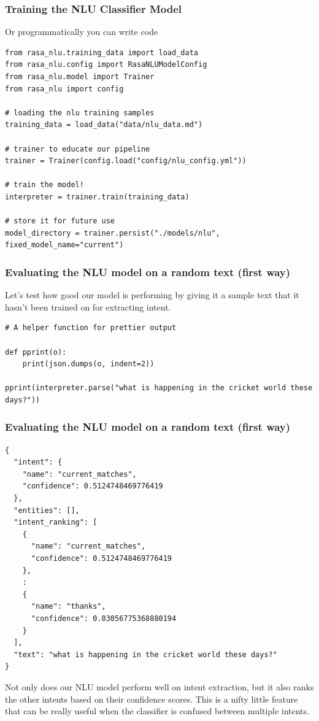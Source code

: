  \begin{frame}[fragile]\frametitle{Training the NLU Classifier Model}
 Or programmatically you can write code
 
\begin{lstlisting}
from rasa_nlu.training_data import load_data
from rasa_nlu.config import RasaNLUModelConfig
from rasa_nlu.model import Trainer
from rasa_nlu import config

# loading the nlu training samples
training_data = load_data("data/nlu_data.md")

# trainer to educate our pipeline
trainer = Trainer(config.load("config/nlu_config.yml"))

# train the model!
interpreter = trainer.train(training_data)

# store it for future use
model_directory = trainer.persist("./models/nlu", fixed_model_name="current")
\end{lstlisting}

\end{frame}

 \begin{frame}[fragile]\frametitle{Evaluating the NLU model on a random text (first way)}
 

Let’s test how good our model is performing by giving it a sample text that it hasn’t been trained on for extracting intent. 
\begin{lstlisting}
# A helper function for prettier output

def pprint(o):   
    print(json.dumps(o, indent=2))
    
pprint(interpreter.parse("what is happening in the cricket world these days?"))
\end{lstlisting}
 
\end{frame}

 \begin{frame}[fragile]\frametitle{Evaluating the NLU model on a random text (first way)}

\begin{lstlisting}
{
  "intent": {
    "name": "current_matches",
    "confidence": 0.5124748469776419
  },
  "entities": [],
  "intent_ranking": [
    {
      "name": "current_matches",
      "confidence": 0.5124748469776419
    },
	:
    {
      "name": "thanks",
      "confidence": 0.03056775368880194
    }
  ],
  "text": "what is happening in the cricket world these days?"
}
\end{lstlisting}
Not only does our NLU model perform well on intent extraction, but it also ranks the other intents based on their confidence scores. This is a nifty little feature that can be really useful when the classifier is confused between multiple intents.
\end{frame}

